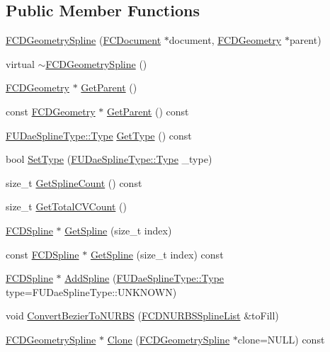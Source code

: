 \subsection*{Public Member Functions}
\begin{DoxyCompactItemize}
\item 
\hyperlink{classFCDGeometrySpline_a38ba060aef184caf6bc732a087715bee}{FCDGeometrySpline} (\hyperlink{classFCDocument}{FCDocument} $\ast$document, \hyperlink{classFCDGeometry}{FCDGeometry} $\ast$parent)
\item 
virtual \hyperlink{classFCDGeometrySpline_ad4f6348fd3f54b04b28d6283239f1573}{$\sim$FCDGeometrySpline} ()
\item 
\hyperlink{classFCDGeometry}{FCDGeometry} $\ast$ \hyperlink{classFCDGeometrySpline_adab00f51a9fd1721b0cb3fde8f21559b}{GetParent} ()
\item 
const \hyperlink{classFCDGeometry}{FCDGeometry} $\ast$ \hyperlink{classFCDGeometrySpline_a995a455064951b00735d4357add0dd95}{GetParent} () const 
\item 
\hyperlink{namespaceFUDaeSplineType_a7db2b90bcd53814239cc29f64754d0ab}{FUDaeSplineType::Type} \hyperlink{classFCDGeometrySpline_a1c66216b24056c9ea49ad0ef71e84d71}{GetType} () const 
\item 
bool \hyperlink{classFCDGeometrySpline_aaa79dd3c303dad513e09428ecb96de64}{SetType} (\hyperlink{namespaceFUDaeSplineType_a7db2b90bcd53814239cc29f64754d0ab}{FUDaeSplineType::Type} \_\-type)
\item 
size\_\-t \hyperlink{classFCDGeometrySpline_ad19110e9e49091f99ff7bde388c072be}{GetSplineCount} () const 
\item 
size\_\-t \hyperlink{classFCDGeometrySpline_aac7369c335120e96cb7565e6a43b75d0}{GetTotalCVCount} ()
\item 
\hyperlink{classFCDSpline}{FCDSpline} $\ast$ \hyperlink{classFCDGeometrySpline_accbb809978a613e00bf5aaeedd68e77f}{GetSpline} (size\_\-t index)
\item 
const \hyperlink{classFCDSpline}{FCDSpline} $\ast$ \hyperlink{classFCDGeometrySpline_a320c80590c623b3c1c385dd10fd375e9}{GetSpline} (size\_\-t index) const 
\item 
\hyperlink{classFCDSpline}{FCDSpline} $\ast$ \hyperlink{classFCDGeometrySpline_af4c756cca2e3801c1955cad21e6bcf67}{AddSpline} (\hyperlink{namespaceFUDaeSplineType_a7db2b90bcd53814239cc29f64754d0ab}{FUDaeSplineType::Type} type=FUDaeSplineType::UNKNOWN)
\item 
void \hyperlink{classFCDGeometrySpline_af86d7ea190d9a1f28727be439a34a17d}{ConvertBezierToNURBS} (\hyperlink{classfm_1_1pvector}{FCDNURBSSplineList} \&toFill)
\item 
\hyperlink{classFCDGeometrySpline}{FCDGeometrySpline} $\ast$ \hyperlink{classFCDGeometrySpline_ad0d92ed47056e7be1a4d99ce291e21ff}{Clone} (\hyperlink{classFCDGeometrySpline}{FCDGeometrySpline} $\ast$clone=NULL) const 
\end{DoxyCompactItemize}


